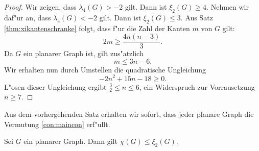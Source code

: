   \begin{proof}
    Wir zeigen, dass $\lambda_4(G) > -2$ gilt. Dann ist $\xi_{2}(G) \geq 4$. 
    Nehmen wir daf"ur an, dass $\lambda_{4}(G) < -2$ gilt.
    Dann ist $\xi_{2}(G)\leq 3$. Aus Satz \ref{thm:xikantenschranke} folgt, dass f"ur die Zahl der Kanten $m$ von $G$ gilt:
    $$2m \geq \frac{4n(n-3)}{3}.$$
    Da $G$ ein planarer Graph ist, gilt zus"atzlich $$ m \leq 3n-6.$$
    Wir erhalten nun durch Umstellen die quadratische Ungleichung $$-2n^{2} +15n -18 \geq 0.$$
    L"osen dieser Ungleichung ergibt $ \frac{3}{2} \leq n \leq 6$, ein Widerspruch zur Vorrausetzung $n\geq 7$.
  \end{proof} 
  Aus dem vorhergehenden Satz erhalten wir sofort, dass jeder planare Graph die Vermutung \ref{con:maincon} erf"ullt.
  \begin{corollary}
    Sei $G$ ein planarer Graph. Dann gilt $\chi(G) \leq \xi_{2}(G) $. 
  \end{corollary}
